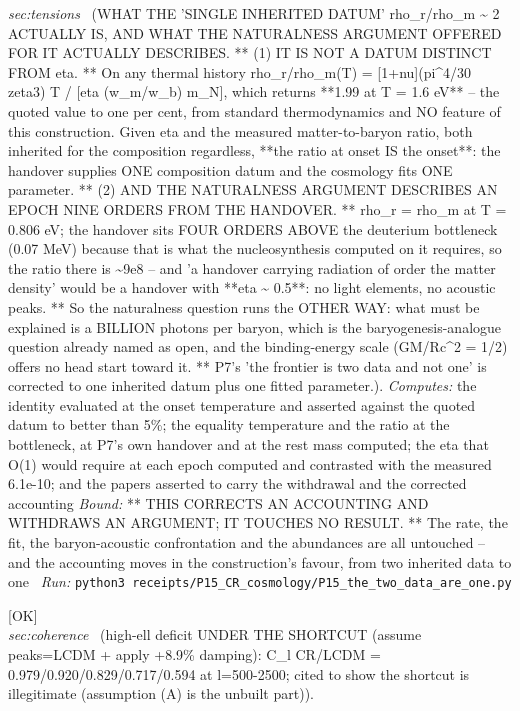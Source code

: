 \begin{description}
\textit{sec:tensions} \ (WHAT THE 'SINGLE INHERITED DATUM' rho\_r/rho\_m \textasciitilde{} 2 ACTUALLY IS, AND WHAT THE NATURALNESS ARGUMENT OFFERED FOR IT ACTUALLY DESCRIBES. ** (1) IT IS NOT A DATUM DISTINCT FROM eta. ** On any thermal history rho\_r/rho\_m(T) = [1+nu](pi\textasciicircum{}4/30 zeta3) T / [eta (w\_m/w\_b) m\_N], which returns **1.99 at T = 1.6 eV** -- the quoted value to one per cent, from standard thermodynamics and NO feature of this construction. Given eta and the measured matter-to-baryon ratio, both inherited for the composition regardless, **the ratio at onset IS the onset**: the handover supplies ONE composition datum and the cosmology fits ONE parameter. ** (2) AND THE NATURALNESS ARGUMENT DESCRIBES AN EPOCH NINE ORDERS FROM THE HANDOVER. ** rho\_r = rho\_m at T = 0.806 eV; the handover sits FOUR ORDERS ABOVE the deuterium bottleneck (0.07 MeV) because that is what the nucleosynthesis computed on it requires, so the ratio there is \textasciitilde{}9e8 -- and 'a handover carrying radiation of order the matter density' would be a handover with **eta \textasciitilde{} 0.5**: no light elements, no acoustic peaks. ** So the naturalness question runs the OTHER WAY: what must be explained is a BILLION photons per baryon, which is the baryogenesis-analogue question already named as open, and the binding-energy scale (GM/Rc\textasciicircum{}2 = 1/2) offers no head start toward it. ** P7's 'the frontier is two data and not one' is corrected to one inherited datum plus one fitted parameter.). 
\emph{Computes:} the identity evaluated at the onset temperature and asserted against the quoted datum to better than 5\%; the equality temperature and the ratio at the bottleneck, at P7's own handover and at the rest mass computed; the eta that O(1) would require at each epoch computed and contrasted with the measured 6.1e-10; and the papers asserted to carry the withdrawal and the corrected accounting
 \emph{Bound:} ** THIS CORRECTS AN ACCOUNTING AND WITHDRAWS AN ARGUMENT; IT TOUCHES NO RESULT. ** The rate, the fit, the baryon-acoustic confrontation and the abundances are all untouched -- and the accounting moves in the construction's favour, from two inherited data to one
\ \emph{Run:} \texttt{python3 receipts/P15\_CR\_cosmology/P15\_the\_two\_data\_are\_one.py}
\item[\label{rcpt:P15_full_transfer_verdict}\texttt{P15\_full\_transfer\_verdict}]\hfill\textsf{[OK]}\\
\textit{sec:coherence} \ (high-ell deficit UNDER THE SHORTCUT (assume peaks=LCDM + apply +8.9\% damping): C\_l CR/LCDM = 0.979/0.920/0.829/0.717/0.594 at l=500-2500; cited to show the shortcut is illegitimate (assumption (A) is the unbuilt part)). 

\end{description}
